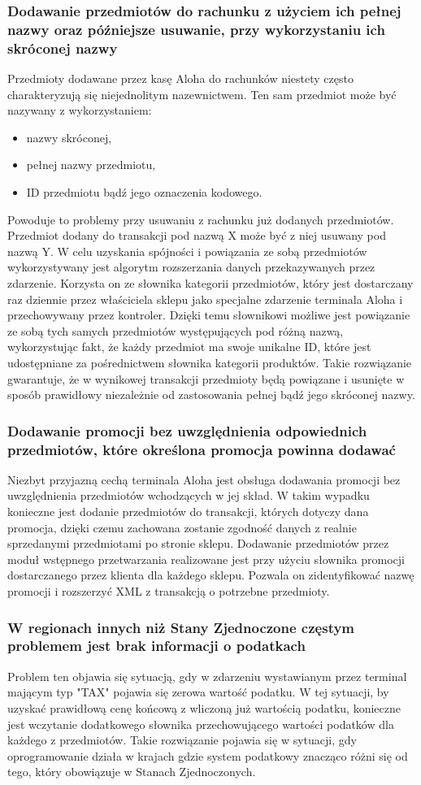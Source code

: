 \documentclass[a4paper]{book}
\begin{document}
\subsubsection{Dodawanie przedmiotów do rachunku z użyciem ich pełnej nazwy oraz późniejsze usuwanie, przy wykorzystaniu ich skróconej nazwy}
Przedmioty dodawane przez kasę Aloha do rachunków niestety często charakteryzują się niejednolitym nazewnictwem. Ten sam przedmiot może być nazywany z wykorzystaniem:
 \begin{itemize}
	\item nazwy skróconej,
	\item pełnej nazwy przedmiotu,
	\item ID przedmiotu bądź jego oznaczenia kodowego.
\end{itemize}
Powoduje to problemy przy usuwaniu z rachunku już dodanych przedmiotów. Przedmiot dodany do transakcji pod nazwą X może być z niej usuwany pod nazwą Y. W celu uzyskania spójności i powiązania ze sobą przedmiotów wykorzystywany jest algorytm rozszerzania danych przekazywanych przez zdarzenie. Korzysta on ze słownika kategorii przedmiotów, który jest dostarczany raz dziennie przez właściciela sklepu jako specjalne zdarzenie terminala Aloha i przechowywany przez kontroler. Dzięki temu słownikowi możliwe jest powiązanie ze sobą tych samych przedmiotów występujących pod różną nazwą, wykorzystując fakt, że każdy przedmiot ma swoje unikalne ID, które jest udostępniane za pośrednictwem słownika kategorii produktów. Takie rozwiązanie gwarantuje, że w wynikowej transakcji przedmioty będą powiązane i usunięte w sposób prawidłowy niezależnie od zastosowania pełnej bądź jego skróconej nazwy.
\subsubsection{Dodawanie promocji bez uwzględnienia odpowiednich przedmiotów, które określona promocja powinna dodawać}
Niezbyt przyjazną cechą terminala Aloha jest obsługa dodawania promocji bez uwzględnienia przedmiotów wchodzących w jej skład. W takim wypadku konieczne jest dodanie przedmiotów do transakcji, których dotyczy dana promocja, dzięki czemu zachowana zostanie zgodność danych z realnie sprzedanymi przedmiotami po stronie sklepu. Dodawanie przedmiotów przez moduł wstępnego przetwarzania realizowane jest przy użyciu słownika promocji dostarczanego przez klienta dla każdego sklepu. Pozwala on zidentyfikować nazwę promocji i rozszerzyć XML z transakcją o potrzebne przedmioty. 
\subsubsection{W regionach innych niż Stany Zjednoczone częstym problemem jest brak informacji o podatkach}
Problem ten objawia się sytuacją, gdy w zdarzeniu wystawianym przez terminal mającym typ "TAX" pojawia się zerowa wartość podatku. W tej sytuacji, by uzyskać prawidłową cenę końcową z wliczoną już wartością podatku, konieczne jest wczytanie dodatkowego słownika przechowującego wartości podatków dla każdego z przedmiotów. Takie rozwiązanie pojawia się w sytuacji, gdy oprogramowanie działa w krajach gdzie system podatkowy znacząco różni się od tego, który obowiązuje w Stanach Zjednoczonych. 
\end{document}
